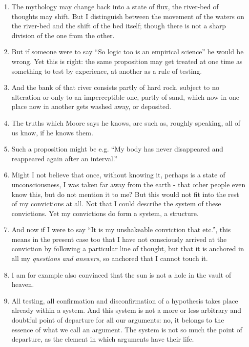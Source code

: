 \documentclass{book}
\begin{document}
\begin{enumerate}
\item
The mythology may change back into a state of flux, the river-bed of thoughts
may shift. But I distinguish between the movement of the waters on the
river-bed and the shift of the bed itself; though there is not a sharp division
of the one from the other.

\item
But if someone were to say ``So logic too is an empirical science'' he would be
wrong. Yet this is right: the same proposition may get treated at one time as
something to test by experience, at another as a rule of testing.

\item
And the bank of that river consists partly of hard rock, subject to no
alteration or only to an imperceptible one, partly of sand, which now in one
place now in another gets washed away, or deposited.

\item
The truths which Moore says he knows, are such as, roughly speaking, all of us
know, if he knows them.

\item
Such a proposition might be e.g. ``My body has never disappeared and reappeared
again after an interval.''

\item
Might I not believe that once, without knowing it, perhaps is a state of
unconsciousness, I was taken far away from the earth - that other people even
know this, but do not mention it to me? But this would not fit into the rest of
my convictions at all. Not that I could describe the system of these
convictions. Yet my convictions do form a system, a structure.

\item
And now if I were to say ``It is my unshakeable conviction that etc.'', this
means in the present case too that I have not consciously arrived at the
conviction by following a particular line of thought, but that it is anchored
in all my \emph{questions and answers}, so anchored that I cannot touch it.

\item
I am for example also convinced that the sun is not a hole in the vault of
heaven.

\item
All testing, all confirmation and disconfirmation of a hypothesis takes place
already within a system. And this system is not a more or less arbitrary and
doubtful point of departure for all our arguments: no, it belongs to the
essence of what we call an argument. The system is not so much the point of
departure, as the element in which arguments have their life.


\end{enumerate}
\end{document}
